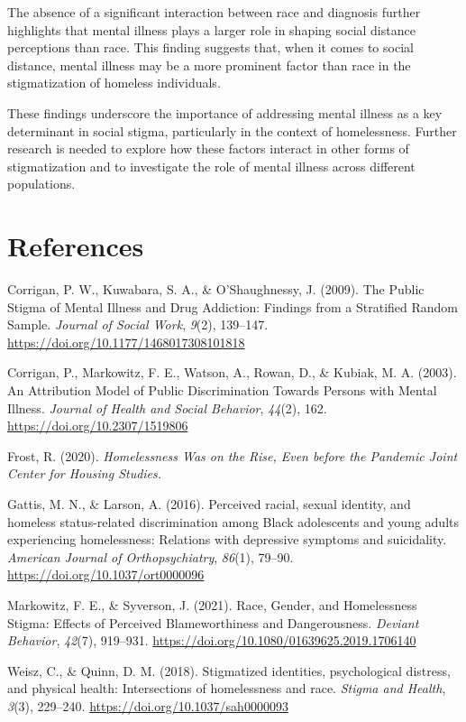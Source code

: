 \documentclass[
  man,
  floatsintext,
  longtable,
  nolmodern,
  notxfonts,
  notimes,
  colorlinks=true,linkcolor=blue,citecolor=blue,urlcolor=blue]{apa7}
\newlength{\cslhangindent}
\newenvironment{CSLReferences}[2] %
 {\begin{list}{}{%
  \setlength{\itemindent}{0pt}
  \setlength{\leftmargin}{0pt}
  \setlength{\parsep}{0pt}
  \ifodd #1
   \setlength{\leftmargin}{\cslhangindent}
   \setlength{\itemindent}{-1\cslhangindent}
  \fi
  \setlength{\itemsep}{#2\baselineskip}}}
 {\end{list}}
\begin{document}
The absence of a significant interaction between race and diagnosis
further highlights that mental illness plays a larger role in shaping
social distance perceptions than race. This finding suggests that, when
it comes to social distance, mental illness may be a more prominent
factor than race in the stigmatization of homeless individuals.

These findings underscore the importance of addressing mental illness as
a key determinant in social stigma, particularly in the context of
homelessness. Further research is needed to explore how these factors
interact in other forms of stigmatization and to investigate the role of
mental illness across different populations.

\section{References}\label{references}

\label{refs}
\begin{CSLReferences}{1}{0}
Corrigan, P. W., Kuwabara, S. A., \& O'Shaughnessy, J. (2009). The
{Public Stigma} of {Mental Illness} and {Drug Addiction}: {Findings}
from a {Stratified Random Sample}. \emph{Journal of Social Work},
\emph{9}(2), 139--147. \url{https://doi.org/10.1177/1468017308101818}

Corrigan, P., Markowitz, F. E., Watson, A., Rowan, D., \& Kubiak, M. A.
(2003). An {Attribution Model} of {Public Discrimination Towards
Persons} with {Mental Illness}. \emph{Journal of Health and Social
Behavior}, \emph{44}(2), 162. \url{https://doi.org/10.2307/1519806}

Frost, R. (2020). \emph{Homelessness {Was} on the {Rise}, {Even} before
the {Pandemic} {\textbar} {Joint Center} for {Housing Studies}.}

Gattis, M. N., \& Larson, A. (2016). Perceived racial, sexual identity,
and homeless status-related discrimination among {Black} adolescents and
young adults experiencing homelessness: {Relations} with depressive
symptoms and suicidality. \emph{American Journal of Orthopsychiatry},
\emph{86}(1), 79--90. \url{https://doi.org/10.1037/ort0000096}

Markowitz, F. E., \& Syverson, J. (2021). Race, {Gender}, and
{Homelessness Stigma}: {Effects} of {Perceived Blameworthiness} and
{Dangerousness}. \emph{Deviant Behavior}, \emph{42}(7), 919--931.
\url{https://doi.org/10.1080/01639625.2019.1706140}

Weisz, C., \& Quinn, D. M. (2018). Stigmatized identities, psychological
distress, and physical health: {Intersections} of homelessness and race.
\emph{Stigma and Health}, \emph{3}(3), 229--240.
\url{https://doi.org/10.1037/sah0000093}

\end{CSLReferences}
\end{document}
